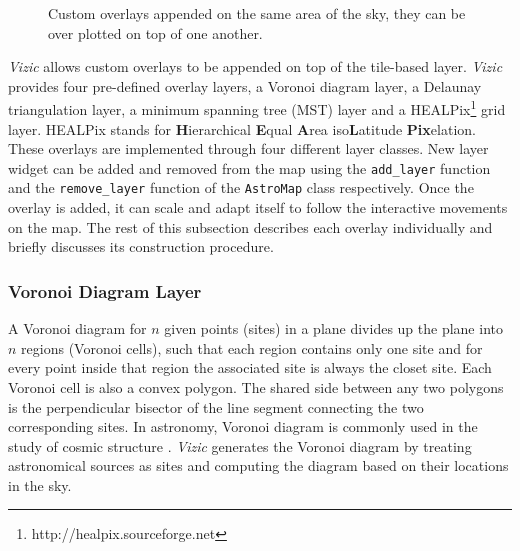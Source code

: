 \documentclass[../vis.tex]{subfiles}
\begin{document}
\begin{figure*}[h!]
\centering
{}
\quad
{}
\quad
{}
\quad
{}
\caption{Custom overlays appended on the same area of the sky, they can be over plotted on top of one another.}
\end{figure*}
\textit{Vizic} allows custom overlays to be appended on top of the tile-based layer.
\textit{Vizic} provides four pre-defined overlay layers, a Voronoi diagram \citep{Voronoi1908} layer, a Delaunay triangulation \citep{Delaunay} layer, a minimum spanning tree (MST) \citep{boruuvka1926, Kruskal1956} layer and a HEALPix\footnote{http://healpix.sourceforge.net} \citep{healpix} grid layer.
HEALPix stands for \textbf{H}ierarchical \textbf{E}qual \textbf{A}rea iso\textbf{L}atitude \textbf{Pix}elation.
These overlays are implemented through four different layer classes.
New layer widget can be added and removed from the map using the \texttt{add\_layer} function and the \texttt{remove\_layer} function of the \texttt{AstroMap} class respectively.
Once the overlay is added, it can scale and adapt itself to follow the interactive movements on the map. The rest of this subsection describes each overlay individually and briefly discusses its construction procedure.

\subsubsection{Voronoi Diagram Layer}
\label{voronoi}
A Voronoi diagram for $n$ given points (sites) in a plane divides up the plane into $n$ regions (Voronoi cells), such that each region contains only one site and for every point inside that region the associated site is always the closet site.
Each Voronoi cell is also a convex polygon. The shared side between any two polygons is the perpendicular bisector of the line segment connecting the two corresponding sites.
In astronomy, Voronoi diagram is commonly used in the study of cosmic structure \citep[e.g.,][]{voronoiLss, voronoiLss2, Weygaert2007}.
\textit{Vizic} generates the Voronoi diagram by treating astronomical sources as sites and computing the diagram based on their locations in the sky.
\end{document}
